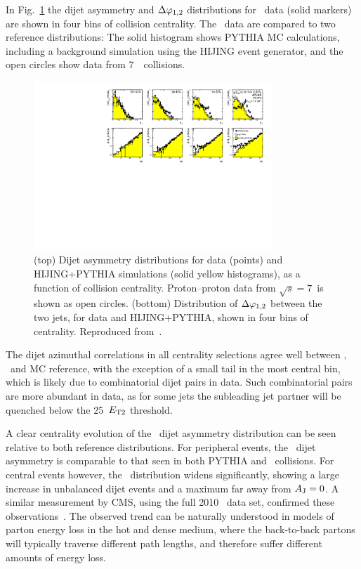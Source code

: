 In Fig.~\ref{fig:GR:final_4x2} the dijet asymmetry and $\Delta\varphi_{1,2}$ distributions
for \PbPb\ data (solid markers) are shown in four bins of collision centrality.
The \PbPb\ data are compared to two reference distributions: The solid histogram shows
PYTHIA MC calculations, including a background simulation using the HIJING event generator,
and the open circles show data from 7\TeV\ \pp\ collisions.
\begin{figure}[!thb]
\begin{center}
\includegraphics[width=0.8\textwidth]{jetfigures/final_4x2_23_newpp.pdf}
\caption{
(top) Dijet asymmetry distributions for data (points) and HIJING+PYTHIA
simulations (solid yellow histograms), as a function of collision centrality.
Proton--proton data from $\sqrt{s}=7$\TeV\ is shown as open circles.
(bottom) Distribution of $\Delta\varphi_{1,2}$ between the two jets,
for data and HIJING+PYTHIA, shown in four bins of centrality.
Reproduced from~\cite{Aad:2010bu}.}
\label{fig:GR:final_4x2}
\end{center}
\end{figure}

The dijet azimuthal correlations in all centrality selections agree well between \PbPb,
\pp\ and MC reference, with the exception of a small tail in the most central bin,
which is likely due to combinatorial dijet pairs in data. Such combinatorial pairs
are more abundant in data, as for some jets the subleading jet partner will be quenched
below the 25\GeVc\ $E_{\rm{T}2}$ threshold.

A clear centrality evolution of the \PbPb\ dijet asymmetry distribution can be seen relative
to both reference distributions.  For peripheral events, the \PbPb\ dijet asymmetry
is comparable to that seen in both PYTHIA and \pp\ collisions. For central events however,
the \AJ\ distribution widens significantly, showing a large increase in unbalanced
dijet events and a maximum far away from $A_\mathrm{J} =  0$.
A similar measurement by CMS, using the full 2010 \PbPb\ data set, confirmed these
observations~\cite{Chatrchyan:2011sx}.
The observed trend can be naturally understood in models of parton energy
loss in the hot and dense medium, where the back-to-back partons will typically traverse
different path lengths, and therefore suffer different amounts of energy loss.

